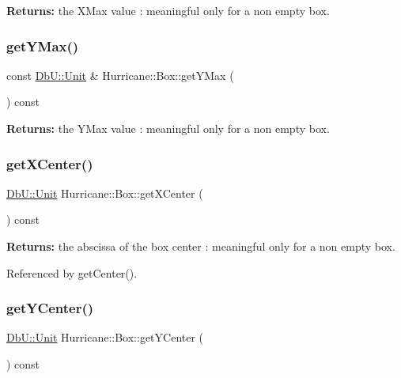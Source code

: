 {\bfseries Returns\+:} the X\+Max value \+: meaningful only for a non empty box. \mbox{\label{classHurricane_1_1Box_a06e1a86a06dacfca6d3403c16affc7e8}} 
\subsubsection{\texorpdfstring{get\+Y\+Max()}{getYMax()}}
{\footnotesize\ttfamily const \mbox{\hyperlink{group__DbUGroup_ga4fbfa3e8c89347af76c9628ea06c4146}{Db\+U\+::\+Unit}} \& Hurricane\+::\+Box\+::get\+Y\+Max (\begin{DoxyParamCaption}{ }\end{DoxyParamCaption}) const\hspace{0.3cm}{\ttfamily [inline]}}

{\bfseries Returns\+:} the Y\+Max value \+: meaningful only for a non empty box. \mbox{\label{classHurricane_1_1Box_a95f35cd33966aad61bb43662306ccf98}} 
\subsubsection{\texorpdfstring{get\+X\+Center()}{getXCenter()}}
{\footnotesize\ttfamily \mbox{\hyperlink{group__DbUGroup_ga4fbfa3e8c89347af76c9628ea06c4146}{Db\+U\+::\+Unit}} Hurricane\+::\+Box\+::get\+X\+Center (\begin{DoxyParamCaption}{ }\end{DoxyParamCaption}) const\hspace{0.3cm}{\ttfamily [inline]}}

{\bfseries Returns\+:} the abscissa of the box center \+: meaningful only for a non empty box. 

Referenced by get\+Center().

\mbox{\label{classHurricane_1_1Box_a659820726e3862a70158b6f5b7644da0}} 
\subsubsection{\texorpdfstring{get\+Y\+Center()}{getYCenter()}}
{\footnotesize\ttfamily \mbox{\hyperlink{group__DbUGroup_ga4fbfa3e8c89347af76c9628ea06c4146}{Db\+U\+::\+Unit}} Hurricane\+::\+Box\+::get\+Y\+Center (\begin{DoxyParamCaption}{ }\end{DoxyParamCaption}) const\hspace{0.3cm}{\ttfamily [inline]}}

